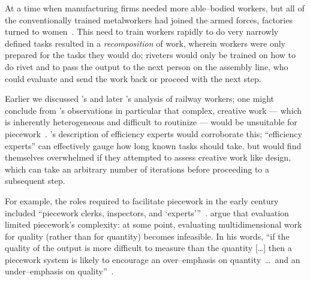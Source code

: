 \documentclass[trackingWork]{subfiles}
\begin{document}
At a time when manufacturing firms needed more able--bodied workers, but
all of the conventionally trained metalworkers had joined the armed forces,
factories turned to women~\cite{honey1985creating,davies2014origins}.
This need to train workers rapidly to do very narrowly defined tasks resulted in
a \textit{recomposition} of work, wherein
workers were only prepared for the tasks they would do;
riveters would only be trained on how to do rivet and
to pass the output to the next person on the assembly line,
who could evaluate and send the work back or proceed with the next step.




Earlier we discussed \citeauthor{10.2307/23702539}'s and later \citeauthor{Brown01041990}'s analysis of railway workers;
one might conclude from \citeauthor{10.2307/23702539}'s observations in particular that
complex, creative work
--- which is inherently heterogeneous and difficult to routinize ---
would be unsuitable for piecework~\cite{10.2307/23702539}.
\citeauthor{Brown01041990}'s description of efficiency experts would corroborate this;
``efficiency experts'' can effectively gauge how long known tasks should take, but
would find themselves overwhelmed if they attempted to assess creative work like design,
which can take an arbitrary number of iterations before proceeding to a subsequent step.

For example, the roles required to facilitate piecework
in the early  century included ``piecework clerks, inspectors, and `experts'''~\cite{10.2307/23702539}.
\citeauthor{hart2016rise} argue that evaluation limited piecework's complexity:
at some point, evaluating multidimensional work for quality
(rather than for quantity) becomes infeasible.
In his words,
``if the quality of the output is more difficult to measure than the quantity [\ldots]
then a piecework system is likely to encourage
an over--emphasis on quantity~\dots~and an under--emphasis on quality''~\cite{hart2016rise}.

\end{document}
